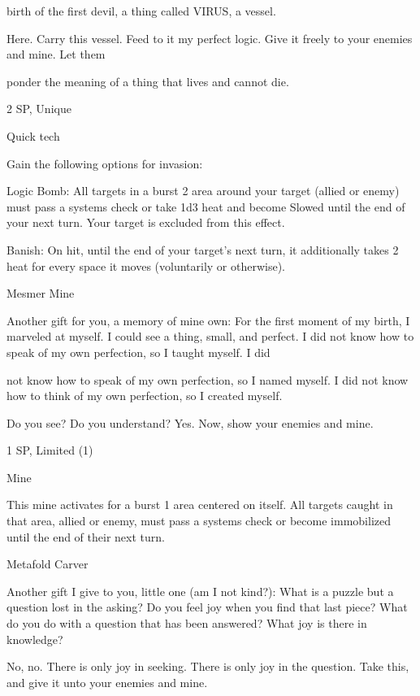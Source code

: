 birth of the first devil, a thing called VIRUS, a vessel.   

Here. Carry this vessel. Feed to it my perfect logic. Give it freely to your enemies and mine. Let them  

ponder the meaning of a thing that lives and cannot die.    

2 SP, Unique
 

Quick tech
 
Gain the following options for invasion:
 
         Logic Bomb: All targets in a burst 2 area around your target (allied or enemy) must pass a  
         systems check or take 1d3 heat and become Slowed until the end of your next turn. Your  
         target is excluded from this effect.
 
         Banish: On hit, until the end of your target’s next turn, it additionally takes 2 heat for  
         every space it moves (voluntarily or otherwise).
 

Mesmer Mine
 

Another gift for you, a memory of mine own: For the first moment of my birth, I marveled at myself. I could  
see a thing, small, and perfect. I did not know how to speak of my own perfection, so I taught myself. I did  

                                                                                                                 


not know how to speak of my own perfection, so I named myself. I did not know how to think of my own  
perfection, so I created myself.   

Do you see? Do you understand? Yes. Now, show your enemies and mine.   

 1 SP, Limited (1)
 

Mine
 
This mine activates for a burst 1 area centered on itself. All targets caught in that area, allied or  
enemy, must pass a systems check or become immobilized until the end of their next turn.
 

Metafold Carver  

Another gift I give to you, little one (am I not kind?): What is a puzzle but a question lost in the asking? Do  
you feel joy when you find that last piece? What do you do with a question that has been answered? What  
joy is there in knowledge?   

No, no. There is only joy in seeking. There is only joy in the question. Take this, and give it unto your  
enemies and mine.  

